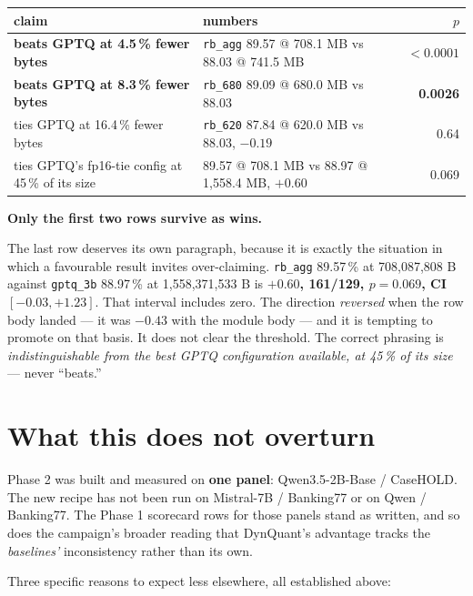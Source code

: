 \documentclass[11pt]{article}
\newcommand{\pct}{\,\%}
\newcommand{\code}[1]{\texttt{#1}}
\newcommand{\best}[1]{\textbf{#1}}
\begin{document}
\begin{center}\small
\begin{tabular}{@{}llr@{}}
\toprule
claim & numbers & $p$ \\
\midrule
\rowcolor{winbg}
\textbf{beats GPTQ at 4.5\pct{} fewer bytes} & \code{rb\_agg} 89.57 @ 708.1 MB vs 88.03 @ 741.5 MB & \best{$<0.0001$} \\
\rowcolor{winbg}
\textbf{beats GPTQ at 8.3\pct{} fewer bytes} & \code{rb\_680} 89.09 @ 680.0 MB vs 88.03 & \best{0.0026} \\
ties GPTQ at 16.4\pct{} fewer bytes & \code{rb\_620} 87.84 @ 620.0 MB vs 88.03, $-0.19$ & 0.64 \\
ties GPTQ's fp16-tie config at 45\pct{} of its size & 89.57 @ 708.1 MB vs 88.97 @ 1{,}558.4 MB, $+0.60$ & 0.069 \\
\bottomrule
\end{tabular}
\end{center}

\textbf{Only the first two rows survive as wins.}

The last row deserves its own paragraph, because it is exactly the situation in which a favourable
result invites over-claiming. \code{rb\_agg} 89.57\pct{} at 708{,}087{,}808 B against
\code{gptq\_3b} 88.97\pct{} at 1{,}558{,}371{,}533 B is \best{$+0.60$, 161/129, $p = 0.069$, CI
$[-0.03, +1.23]$}. That interval includes zero. The direction \emph{reversed} when the row body
landed --- it was $-0.43$ with the module body --- and it is tempting to promote on that basis. It
does not clear the threshold. The correct phrasing is \emph{indistinguishable from the best GPTQ
configuration available, at 45\pct{} of its size} --- never ``beats.''

\section{What this does not overturn}
\label{sec:notoverturn}

Phase 2 was built and measured on \textbf{one panel}: Qwen3.5-2B-Base / CaseHOLD. The new recipe
has not been run on Mistral-7B / Banking77 or on Qwen / Banking77. The Phase 1 scorecard rows for
those panels stand as written, and so does the campaign's broader reading that DynQuant's advantage
tracks the \emph{baselines'} inconsistency rather than its own.

Three specific reasons to expect less elsewhere, all established above:
\end{document}
